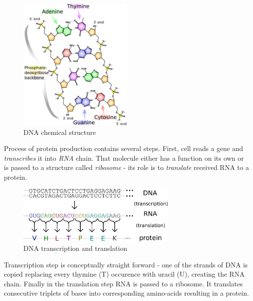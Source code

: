 \documentclass[times, utf8, diplomski]{fer}
\begin{document}
\begin{figure}[!ht]
\begin{center}
	\includegraphics[width=0.5\textwidth]{../img/DNA_chemical_structure.pdf}
	\caption{DNA chemical structure\protect\cite{dna.chemical.structure.img}}\label{dna.chemical.structure}
\end{center}
\end{figure}

Process of protein production contains several steps. First, cell reads a gene and \emph{transcribes} it into \emph{RNA} chain. That molecule either has a function on its own or is passed to a structure called \emph{ribosome} - its role is to \emph{translate} received RNA to a protein.
\\

\begin{figure}[!ht]
\begin{center}
	\includegraphics[width=0.7\textwidth]{../img/Genetic_code.pdf}
	\caption{DNA transcription and translation\cite{dna.transcription.translation.img}}\label{genetic.code}
\end{center}
\end{figure}

Transcription step is conceptually straight forward - one of the strands of DNA is copied replacing every thymine (T) occurence with uracil (U), creating the RNA chain. Finally in the translation step RNA is passed to a ribosome. It translates consecutive triplets of bases into corresponding amino-acids resulting in a protein. 
\end{document}
